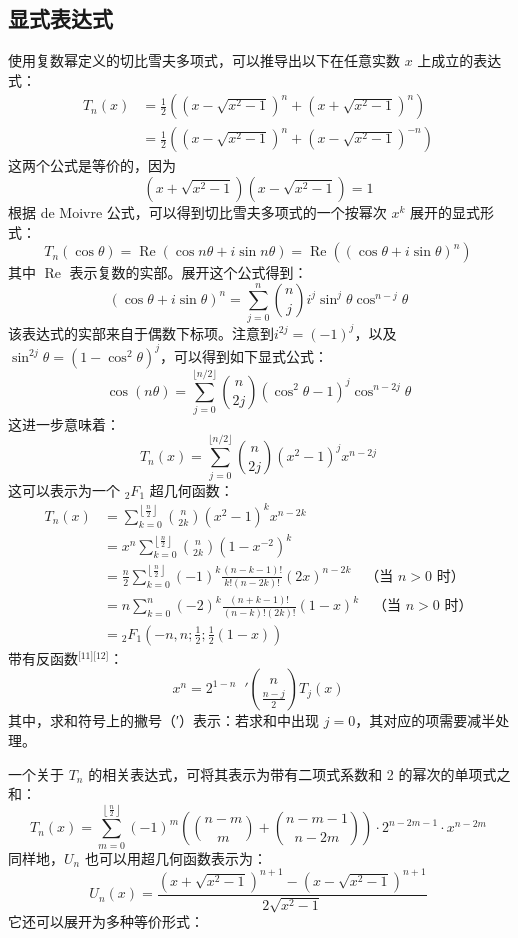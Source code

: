 \subsection{显式表达式}
使用复数幂定义的切比雪夫多项式，可以推导出以下在任意实数 $x$ 上成立的表达式：\
$$
\begin{aligned}
T_n(x) &= \frac{1}{2} \left( \left(x - \sqrt{x^2 - 1} \right)^n + \left(x + \sqrt{x^2 - 1} \right)^n \right) \\
&= \frac{1}{2} \left( \left(x - \sqrt{x^2 - 1} \right)^n + \left(x - \sqrt{x^2 - 1} \right)^{-n} \right)
\end{aligned}~
$$
这两个公式是等价的，因为
$$
\left(x + \sqrt{x^2 - 1} \right)\left(x - \sqrt{x^2 - 1} \right) = 1~
$$
根据 de Moivre 公式，可以得到切比雪夫多项式的一个按幂次 $x^k$ 展开的显式形式：
$$
T_n(\cos \theta) = \operatorname{Re}(\cos n\theta + i\sin n\theta) = \operatorname{Re}((\cos \theta + i \sin \theta)^n)~
$$
其中 $\operatorname{Re}$ 表示复数的实部。展开这个公式得到：
$$
(\cos \theta + i \sin \theta)^n = \sum_{j=0}^{n} \binom{n}{j} i^j \sin^j \theta \cos^{n-j} \theta~
$$
该表达式的实部来自于偶数下标项。注意到$i^{2j} = (-1)^j$，以及$\sin^{2j} \theta = (1 - \cos^2 \theta)^j$，可以得到如下显式公式：
$$
\cos(n\theta) = \sum_{j = 0}^{\lfloor n/2 \rfloor} \binom{n}{2j} (\cos^2 \theta - 1)^j \cos^{n - 2j} \theta~
$$
这进一步意味着：
$$
T_n(x) = \sum_{j = 0}^{\lfloor n/2 \rfloor} \binom{n}{2j} (x^2 - 1)^j x^{n - 2j}~
$$
这可以表示为一个 ${}_2F_1$ 超几何函数：
$$
\begin{aligned}
T_n(x) &= \sum_{k=0}^{\left\lfloor \frac{n}{2} \right\rfloor}\binom{n}{2k}(x^2 - 1)^k x^{n - 2k}\\
&= x^n \sum_{k=0}^{\left\lfloor \frac{n}{2} \right\rfloor} \binom{n}{2k}(1 - x^{-2})^k\\
&= \frac{n}{2} \sum_{k=0}^{\left\lfloor \frac{n}{2} \right\rfloor} (-1)^k \frac{(n-k-1)!}{k!(n-2k)!}(2x)^{n - 2k} \quad \text{（当 } n > 0 \text{ 时）}\\
&= n \sum_{k=0}^{n} (-2)^k \frac{(n+k-1)!}{(n-k)!(2k)!} (1 - x)^k \quad \text{（当 } n > 0 \text{ 时）}\\
&= {}_2F_1 \left( -n, n; \frac{1}{2}; \frac{1}{2}(1 - x) \right)
\end{aligned}~
$$
带有反函数\(^\text{[11][12]}\)：
$$
x^n = 2^{1 - n} \mathop{\sum_{\substack{j = 0 \\ j \equiv n \bmod 2}}^{n}}' \binom{n}{\tfrac{n - j}{2}} T_j(x)~
$$
其中，求和符号上的撇号（′）表示：若求和中出现 $j = 0$，其对应的项需要减半处理。

一个关于 $T_n$ 的相关表达式，可将其表示为带有二项式系数和 2 的幂次的单项式之和：
$$
T_n(x) = \sum_{m = 0}^{\left\lfloor \frac{n}{2} \right\rfloor} (-1)^m \left( \binom{n - m}{m} + \binom{n - m - 1}{n - 2m} \right) \cdot 2^{n - 2m - 1} \cdot x^{n - 2m}~
$$
同样地，$U_n$ 也可以用超几何函数表示为：
$$
U_n(x) = \frac{(x + \sqrt{x^2 - 1})^{n+1} - (x - \sqrt{x^2 - 1})^{n+1}}{2\sqrt{x^2 - 1}}~
$$
它还可以展开为多种等价形式：


